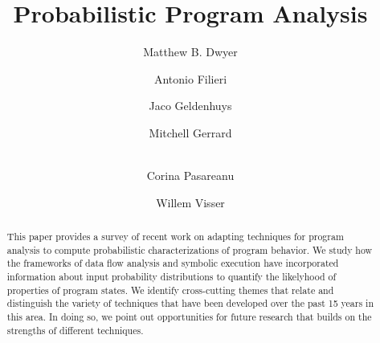 \documentclass[runningheads,a4paper]{llncs}
\begin{document}
\mainmatter  %

\newcommand{\mycomment}[1]{\textit{\textcolor{red}{#1}}}
\newcommand{\ignore}[1]{}

\title{Probabilistic Program Analysis}


\author{Matthew B. Dwyer
\and Antonio Filieri\and Jaco Geldenhuys\and Mitchell Gerrard\and\\
Corina Pasareanu\and Willem Visser}
%


%
%

\maketitle


\begin{abstract}
This paper provides a survey of recent work on adapting 
techniques for program analysis to compute probabilistic
characterizations of program behavior.  We study how the
frameworks of data flow analysis and symbolic execution have
incorporated information about input probability distributions
to quantify the likelyhood of properties of program states.
We identify cross-cutting themes that relate and distinguish
the variety of
techniques that have been developed over the past 15 years
in this area.  In doing so, we point out opportunities for
future research that builds on the strengths of different techniques.
\end{abstract}
\end{document}

